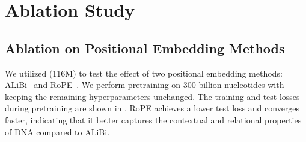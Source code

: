 
\section{Ablation Study}
\label{sec:ablation}
\subsection{Ablation on Positional Embedding Methods}

We utilized \method(116M) to test the effect of two positional embedding methods: ALiBi~\citep{press2021train} and RoPE~\citep{su2024roformer}. We perform pretraining on 300 billion nucleotides with keeping the remaining hyperparameters unchanged. 
The training and test losses during pretraining are shown in . 
RoPE achieves a lower test loss and converges faster, indicating that it better captures the contextual and relational properties of DNA compared to ALiBi.


